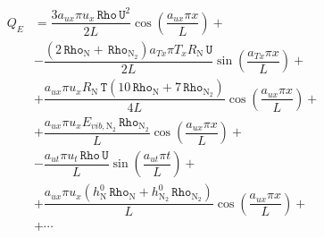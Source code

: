 \documentclass[10pt]{article}
\newcommand{\Rho}{\,\mathtt{Rho}}
\newcommand{\T}{\,\mathtt{T}}
\newcommand{\U}{\,\mathtt{U}}
\begin{document}
\begin{equation*}
\begin{split}
 Q_E &= \dfrac{3 a_{ux} \pi u_x \Rho \U^2 }{2L}\cos\left(\dfrac{a_{ux} \pi x}{L}\right) +\\
&-\dfrac{ (2 \Rho_\text{N} +\Rho_{\text{N}_2}) a_{Tx} \pi T_x R_\text{N}  \U }{2L}\sin\left(\dfrac{a_{Tx} \pi x}{L}\right)+\\
&+\dfrac{a_{ux} \pi u_x R_\text{N}  \T  (10 \Rho_\text{N} +7 \Rho_{\text{N}_2}) }{4L}\cos\left(\dfrac{a_{ux} \pi x}{L}\right) +\\
&+\dfrac{a_{ux} \pi u_x E_{vib, \text{N}_2} \Rho_{\text{N}_2} }{L}\cos\left(\dfrac{a_{ux} \pi x}{L}\right) +\\
&-\dfrac{a_{ut} \pi u_t \Rho \U }{L}\sin\left(\dfrac{a_{ut} \pi t}{L}\right) +\\
&+\dfrac{ a_{ux} \pi u_x (h^0_\text{N} \Rho_\text{N} +h^0_{\text{N}_2} \Rho_{\text{N}_2})}{L}\cos\left(\dfrac{a_{ux} \pi x}{L}\right) +\\
&+\cdots
\end{split}
\end{equation*}
\end{document}
